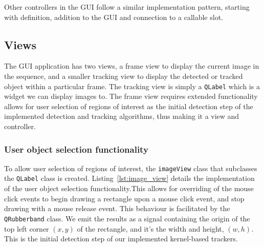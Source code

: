 Other controllers in the GUI follow a similar implementation pattern, starting
with definition, addition to the GUI and connection to a callable slot.

\subsection{Views}
The GUI application has two views, a frame view to display the current image in the
sequence, and a smaller tracking view to display the detected or tracked object
within a particular frame.  
The tracking view is simply a \lstinline{QLabel} which is a widget we can display images to.
The frame view requires extended functionality allows for user selection of
regions of interest as the initial detection step of the implemented detection
and tracking algorithms, thus making it a view and controller.

\subsubsection{User object selection functionality}
To allow user selection of regions of interest, the \lstinline{imageView} class
that subclasses the \lstinline{QLabel} class is created.
Listing~\ref{lst:image_view} details the implementation of the user object
selection functionality.This allows for overriding of the mouse click events to
begin drawing a rectangle upon a mouse click event, and stop drawing with a
mouse release event.  This behaviour is facilitated by the
\lstinline{QRubberband} class. We emit the results as a signal containing the
origin of the top left corner $(x,y)$ of the rectangle, and it's the width and
height, $(w, h)$. This is the initial detection step of our implemented
kernel-based trackers.

